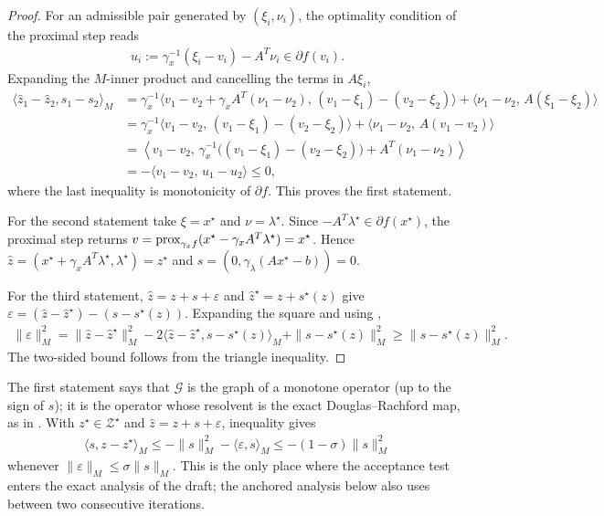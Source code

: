 \begin{proof}
    For an admissible pair generated by $(\xi_i, \nu_i)$, the optimality condition of the proximal step reads
    \begin{align}
        u_i := \gamma_x^{-1}(\xi_i - v_i) - A^T\nu_i \in \partial f(v_i). \label{eq:acc-prox-optimality}
    \end{align}
    Expanding the $M$-inner product and cancelling the terms in $A\xi_i$,
    \begin{align}
        \langle \hat z_1 - \hat z_2, s_1 - s_2\rangle_M
        &= \gamma_x^{-1}\langle v_1 - v_2 + \gamma_x A^T(\nu_1 - \nu_2),\, (v_1 - \xi_1) - (v_2 - \xi_2)\rangle
           + \langle \nu_1 - \nu_2,\, A(\xi_1 - \xi_2)\rangle \\
        &= \gamma_x^{-1}\langle v_1 - v_2,\, (v_1 - \xi_1) - (v_2 - \xi_2)\rangle
           + \langle \nu_1 - \nu_2,\, A(v_1 - v_2)\rangle \\
        &= \left\langle v_1 - v_2,\, \gamma_x^{-1}\big((v_1 - \xi_1) - (v_2 - \xi_2)\big) + A^T(\nu_1 - \nu_2)\right\rangle \\
        &= -\langle v_1 - v_2,\, u_1 - u_2\rangle \le 0,
    \end{align}
    where the last inequality is monotonicity of $\partial f$.
    This proves the first statement.

    For the second statement take $\xi = x^\star$ and $\nu = \lambda^\star$.
    Since $-A^T\lambda^\star \in \partial f(x^\star)$, the proximal step returns $v = \mathrm{prox}_{\gamma_x f}(x^\star - \gamma_x A^T\lambda^\star) = x^\star$.
    Hence $\hat z = (x^\star + \gamma_x A^T\lambda^\star, \lambda^\star) = z^\star$ and $s = (0, \gamma_\lambda(Ax^\star - b)) = 0$.

    For the third statement, $\hat z = z + s + \varepsilon$ and $\hat z^\star = z + s^\star(z)$ give $\varepsilon = (\hat z - \hat z^\star) - (s - s^\star(z))$.
    Expanding the square and using ,
    \begin{align}
        \|\varepsilon\|_M^2 = \|\hat z - \hat z^\star\|_M^2 - 2\langle \hat z - \hat z^\star, s - s^\star(z)\rangle_M + \|s - s^\star(z)\|_M^2 \ge \|s - s^\star(z)\|_M^2.
    \end{align}
    The two-sided bound  follows from the triangle inequality.
\end{proof}

The first statement says that $\mathcal{G}$ is the graph of a monotone operator (up to the sign of $s$); it is the operator whose resolvent is the exact Douglas--Rachford map, as in \citet{EcksteinRelativeError2018}.
With $z^\star \in \mathcal{Z}^\star$ and $\hat z = z + s + \varepsilon$, inequality  gives
\begin{align}
    \langle s, z - z^\star\rangle_M \le -\|s\|_M^2 - \langle \varepsilon, s\rangle_M \le -(1-\sigma)\|s\|_M^2 \label{eq:acc-star-inequality}
\end{align}
whenever $\|\varepsilon\|_M \le \sigma\|s\|_M$.
This is the only place where the acceptance test enters the exact analysis of the draft; the anchored analysis below also uses  between two consecutive iterations.

